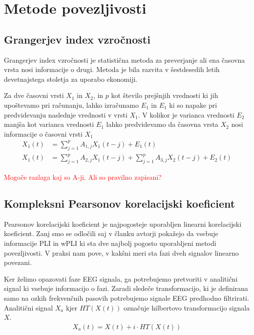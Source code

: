 \section{Metode povezljivosti}
\subsection{Grangerjev index vzročnosti}
Grangerjev index vzročnosti je statistična metoda za preverjanje ali ena časovna vrsta nosi informacije o drugi. Metoda je bila razvita v šestdesedih letih devetnajstega stoletja za uporabo ekonomiji.

Za dve časovni vrsti $X_1$ in $X_2$, in $p$ kot število prejšnjih vrednosti ki jih upoštevamo pri računanju, lahko izračunamo $E_1$ in $E_1$ ki so napake pri predvidevanju naslednje vrednosti v vrsti $X_1$. V kolikor je varianca vrednosti $E_2$ manjša kot varianca vrednosti $E_1$ lahko predvidevamo da časovna vrsta $X_2$ nosi informacije o časovni vrsti $X_1$
\begin{align*}
X_1(t) &= \sum_{j=1}^{p} A_{1,j} X_1(t-j) + E_1(t)\\
X_1(t) &= \sum_{j=1}^{p} A_{2,j} X_1(t-j) + \sum_{j=1}^{p} A_{3,j} X_2(t-j) + E_2(t)
\end{align*}


\textcolor{red}{Mogoče razlaga kaj so A-ji. Ali so pravilno zapisani?}

\cite{seth_granger_2007}

\subsection{Kompleksni Pearsonov korelacijski koeficient}
Pearsonov korelacijski koeficient je najpogosteje uporabljen linearni korelacijski koeficient. Zanj smo se odločili saj v članku   avtorji pokažejo da vsebuje informacije PLI in wPLI ki sta dve najbolj pogosto uporabljeni metodi povezljivosti. V praksi nam pove, v kakšni meri sta fazi dveh signalov linearno povezani.

Ker želimo opazovati faze EEG signala, ga potrebujemo pretvoriti v analitični signal ki vsebuje informacijo o fazi. Zaradi sledeče transformacijo, ki je definirana samo na ozkih frekvenčnih pasovih potrebujemo signale EEG predhodno filtrirati. Analitični signal $X_a$ kjer $HT(X(t))$ označuje hilbertovo transformacijo signala $X$.
\begin{align*}
    X_a(t) = X(t) + i \cdot HT(X(t))
\end{align*}



